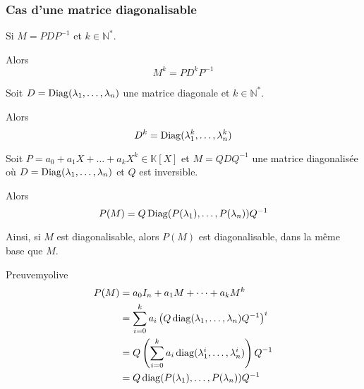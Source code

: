     \subsubsection{Cas d’une matrice diagonalisable}

    \begin{prop}{}{}
        Si $M = P D P^{-1}$ et $k \in \mathbb{N}^*$.

        Alors \[ M^k = P D^k P^{-1} \]
    \end{prop}

    \begin{prop}{}{}
        Soit $D = \operatorname{Diag}(\lambda_1,\ldots,\lambda_n)$ une matrice diagonale et $k \in \mathbb{N}^*$.

        Alors \[ D^k = \operatorname{Diag}(\lambda_1^k,\ldots,\lambda_n^k) \]
    \end{prop}

    \begin{prop}{}{}
        Soit $P = a_0 + a_1 X + \ldots + a_k X^k \in \mathbb{K}[X]$ et $M = Q D Q^{-1}$ une matrice diagonalisée où $D = \operatorname{Diag}(\lambda_1,\ldots,\lambda_n)$ et $Q$ est inversible.

        Alors 
        \[ P(M) = Q \operatorname{Diag}(P(\lambda_1), \ldots, P(\lambda_n)) Q^{-1} \]
    \end{prop}

    Ainsi, si $M$ est diagonalisable, alors $P(M)$ est diagonalisable, dans la même base que $M$.

    \begin{demo}{Preuve}{myolive}
        \begin{align*}
            P(M)
            &= a_0 I_n + a_1 M + \cdots + a_k M^k \\
            &= \sum_{i=0}^{k} a_i \left(Q \operatorname{diag}(\lambda_1, \ldots, \lambda_n) Q^{-1}\right)^i \\
            &= Q \left(\sum_{i=0}^{k} a_i \operatorname{diag}(\lambda_1^i, \ldots, \lambda_n^i)\right) Q^{-1} \\
            &= Q \operatorname{diag}(P(\lambda_1), \ldots, P(\lambda_n)) Q^{-1}
        \end{align*}
    \end{demo}

